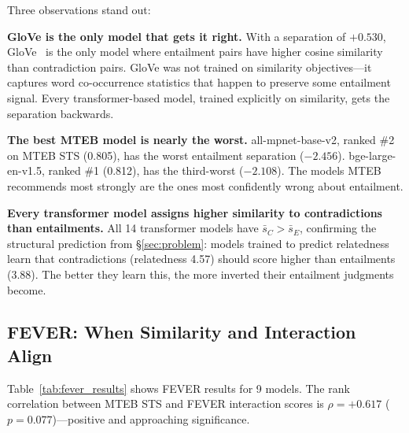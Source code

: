 \documentclass{article}
\begin{document}
Three observations stand out:

\textbf{GloVe is the only model that gets it right.} With a separation of $+0.530$, GloVe~\citep{pennington2014glove} is the only model where entailment pairs have higher cosine similarity than contradiction pairs. GloVe was not trained on similarity objectives---it captures word co-occurrence statistics that happen to preserve some entailment signal. Every transformer-based model, trained explicitly on similarity, gets the separation backwards.

\textbf{The best MTEB model is nearly the worst.} all-mpnet-base-v2, ranked \#2 on MTEB STS (0.805), has the worst entailment separation ($-2.456$). bge-large-en-v1.5, ranked \#1 (0.812), has the third-worst ($-2.108$). The models MTEB recommends most strongly are the ones most confidently wrong about entailment.

\textbf{Every transformer model assigns higher similarity to contradictions than entailments.} All 14 transformer models have $\bar{s}_C > \bar{s}_E$, confirming the structural prediction from \S\ref{sec:problem}: models trained to predict relatedness learn that contradictions (relatedness 4.57) should score higher than entailments (3.88). The better they learn this, the more inverted their entailment judgments become.

\subsection{FEVER: When Similarity and Interaction Align}

Table~\ref{tab:fever_results} shows FEVER results for 9 models. The rank correlation between MTEB STS and FEVER interaction scores is $\rho = +0.617$ ($p = 0.077$)---positive and approaching significance.
\end{document}
